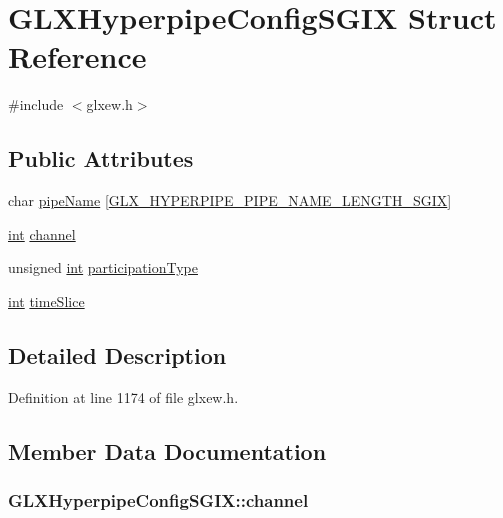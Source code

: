 \hypertarget{struct_g_l_x_hyperpipe_config_s_g_i_x}{\section{G\-L\-X\-Hyperpipe\-Config\-S\-G\-I\-X Struct Reference}
\label{struct_g_l_x_hyperpipe_config_s_g_i_x}
}


{\ttfamily \#include $<$glxew.\-h$>$}

\subsection*{Public Attributes}
\begin{DoxyCompactItemize}
\item 
char \hyperlink{struct_g_l_x_hyperpipe_config_s_g_i_x_a9e3748f92005cac81cb44d4c67acccb8}{pipe\-Name} \mbox{[}\hyperlink{glxew_8h_ae1c8261c0861010d8003a31d07e26005}{G\-L\-X\-\_\-\-H\-Y\-P\-E\-R\-P\-I\-P\-E\-\_\-\-P\-I\-P\-E\-\_\-\-N\-A\-M\-E\-\_\-\-L\-E\-N\-G\-T\-H\-\_\-\-S\-G\-I\-X}\mbox{]}
\item 
\hyperlink{wglew_8h_a500a82aecba06f4550f6849b8099ca21}{int} \hyperlink{struct_g_l_x_hyperpipe_config_s_g_i_x_abc812d8796ba89d5de4e33b3532d8335}{channel}
\item 
unsigned \hyperlink{wglew_8h_a500a82aecba06f4550f6849b8099ca21}{int} \hyperlink{struct_g_l_x_hyperpipe_config_s_g_i_x_a093cfaaec305531f66e1120929b5b01b}{participation\-Type}
\item 
\hyperlink{wglew_8h_a500a82aecba06f4550f6849b8099ca21}{int} \hyperlink{struct_g_l_x_hyperpipe_config_s_g_i_x_afe9288e75dc1ae5e0f33eff978d7024d}{time\-Slice}
\end{DoxyCompactItemize}


\subsection{Detailed Description}


Definition at line 1174 of file glxew.\-h.



\subsection{Member Data Documentation}
\hypertarget{struct_g_l_x_hyperpipe_config_s_g_i_x_abc812d8796ba89d5de4e33b3532d8335}{
\subsubsection[{channel}]{ G\-L\-X\-Hyperpipe\-Config\-S\-G\-I\-X\-::channel}}\label{struct_g_l_x_hyperpipe_config_s_g_i_x_abc812d8796ba89d5de4e33b3532d8335}


